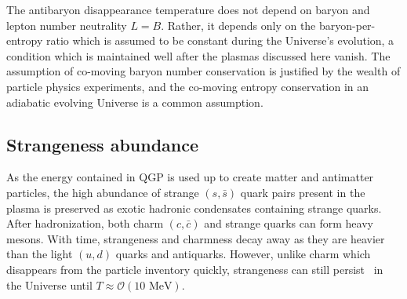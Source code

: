 \documentclass[universe,article,submit,moreauthors,pdftex,a4paper]{Definitions/mdpi}
\newcommand{\MeV}{\text{ MeV}}
\begin{document}
The antibaryon disappearance temperature does not depend on baryon and lepton number neutrality $L=B$. Rather, it depends only on the baryon-per-entropy ratio which is assumed to be constant during the Universe's evolution, a condition which is maintained well after the plasmas discussed here vanish. The assumption of co-moving baryon number conservation is justified by the wealth of particle physics experiments, and the co-moving entropy conservation in an adiabatic evolving Universe is a common assumption.

\subsection{Strangeness abundance}\label{sec:Strangeness}
\noindent 
As the energy contained in QGP is used up to create matter and antimatter particles, the high abundance of strange $(s,\bar{s})$ quark pairs present in the plasma is preserved as exotic hadronic condensates containing strange quarks. After hadronization, both charm $(c,\bar{c})$ and strange quarks can form heavy mesons. With time, strangeness and charmness decay away as they are heavier than the light $(u,d)$ quarks and antiquarks. However, unlike charm which disappears from the particle inventory quickly, strangeness can still persist~\cite{Yang:2021bko} in the Universe until $T\approx\mathcal{O}(10\MeV)$.
\end{document}
